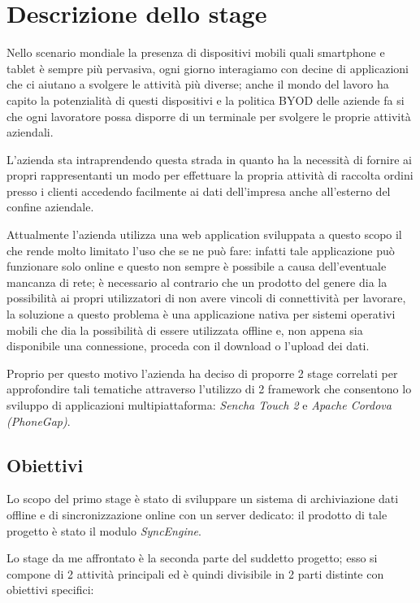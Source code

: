 \section{Descrizione dello stage}
Nello scenario mondiale la presenza di dispositivi mobili quali smartphone e tablet è sempre più pervasiva, ogni giorno interagiamo con decine di applicazioni che ci aiutano a svolgere le attività più diverse; anche il mondo del lavoro ha capito la potenzialità di questi dispositivi e la politica \ac{BYOD} delle aziende fa si che ogni lavoratore possa disporre di un terminale per svolgere le proprie attività aziendali.

L'azienda \myCompany sta intraprendendo questa strada in quanto ha la necessità di fornire ai propri rappresentanti un modo per effettuare la propria attività di raccolta ordini presso i clienti accedendo facilmente ai dati dell'impresa anche all'esterno del confine aziendale.

Attualmente l'azienda utilizza una web application sviluppata a questo scopo il che rende molto limitato l'uso che se ne può fare: infatti tale applicazione può funzionare solo online e questo non sempre è possibile a causa dell'eventuale mancanza di rete; è necessario al contrario che un prodotto del genere dia la possibilità ai propri utilizzatori di non avere vincoli di connettività per lavorare, la soluzione a questo problema è una applicazione nativa per sistemi operativi mobili che dia la possibilità di essere utilizzata offline e, non appena sia disponibile una connessione, proceda con il download o l'upload dei dati.

Proprio per questo motivo l'azienda ha deciso di proporre 2 stage correlati per approfondire tali tematiche attraverso l'utilizzo di 2 framework che consentono lo sviluppo di applicazioni multipiattaforma: \emph{Sencha Touch 2} e \emph{Apache Cordova (PhoneGap)}.


\subsection{Obiettivi}
Lo scopo del primo stage è stato di sviluppare un sistema di archiviazione dati offline e di sincronizzazione online con un server dedicato: il prodotto di tale progetto è stato il modulo \emph{SyncEngine}.

Lo stage da me affrontato è la seconda parte del suddetto progetto; esso si compone di 2 attività principali ed è quindi divisibile in 2 parti distinte con obiettivi specifici:


